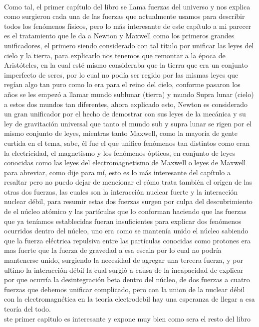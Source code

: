 \documentclass[12pt]{article}
\begin{document}
\paragraph*{}
\textsf{Como tal, el primer capítulo del libro se llama fuerzas del universo y nos explica como surgieron cada una de las fuerzas
que actualmente usamos para describir todos los fenómenos físicos, pero lo más interesante de este capítulo a mi parecer es
el tratamiento que le da a Newton y Maxwell como los primeros grandes unificadores, el primero siendo considerado con tal título por 
unificar las leyes del cielo y la tierra, para explicarlo nos tenemos que remontar a la época de Aristóteles, en la cual esté mismo
consideraba que la tierra que era un conjunto imperfecto de seres, por lo cual no podía ser regido por las mismas leyes que regían 
algo tan puro como lo era para el reino del cielo, conforme pasaron los años se les empezó a llamar mundo sublunar (tierra) y mundo 
Supra lunar (cielo) a estos dos mundos tan diferentes, ahora explicado esto, Newton es considerado un gran unificador por el hecho de 
demostrar con sus leyes de la mecánica y su ley de gravitación universal que tanto el mundo sub y supra lunar se rigen por el mismo 
conjunto de leyes, mientras tanto Maxwell, como la mayoría de gente curtida en el tema, sabe, él fue el que unifico fenómenos tan 
distintos como eran la electricidad, el magnetismo y los fenómenos ópticos, en conjunto de leyes conocidas como las leyes del 
electromagnetismo de Maxwell o leyes de Maxwell para abreviar, como dije para mí, esto es lo más interesante del capítulo a resaltar
pero no puedo dejar de mencionar el cómo trata también el origen de las otras dos fuerzas, las cuales son la interacción nuclear fuerte y
la interacción nuclear débil, para resumir estas dos fuerzas surgen por culpa del descubrimiento de el núcleo atómico y las partículas que 
lo conforman haciendo que las fuerzas que ya teníamos establecidas fueran insuficientes para explicar dos fenómenos ocurridos dentro del núcleo,
uno era como se mantenía unido el núcleo sabiendo que la fuerza eléctrica repulsiva entre las partículas conocidas como protones era mas fuerte
que la fuerza de gravedad a esa escala por lo cual no podría mantenerse unido, surgiendo la necesidad de agregar una tercera fuerza, y por ultimo
la interacción débil la cual surgió a causa de la incapacidad de explicar por que ocurría la desintegración beta dentro del núcleo, de dos fuerzas
a cuatro fuerzas que debemos unificar complicado, pero con la union de la nuclear débil con la electromagnética en la teoría electrodebil hay una
esperanza de llegar a esa teoría del todo.\\ste primer capitulo es interesante y expone muy bien como sera el resto del libro}
\end{document}
